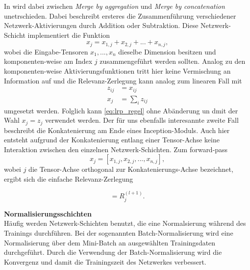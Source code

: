 \documentclass[11pt,a4paper]{article}
\numberwithin{equation}{section}
\begin{document}
	In \cite{sebastianlapuschkin} wird dabei zwischen \textit{Merge by aggregation} und \textit{Merge by concatenation} unetrschieden. Dabei beschreibt ersteres die Zusammenführung verschiedener Netzwerk-Aktivierungen durch Addition oder Subtraktion. Diese Netzwerk-Schicht implementiert die Funktion
	\begin{equation}
		x_j = x_{1,j} + x_{2,j} + ... + x_{n,j},
	\end{equation}
	wobei die Eingabe-Tensoren $x_1, ..., x_n$ dieselbe Dimension besitzen und komponenten-weise am Index $j$ zusammengeführt werden sollten. Analog zu den komponenten-weise Aktivierungsfunktionen tritt hier keine Vermischung an Information auf und die Relevanz-Zerlegung kann analog zum linearen Fall mit 
	\begin{align}
		z_{ij} &= x_{ij}\\
		x_j &= \sum_i{z_{ij}}
	\end{align} umgesetzt werden. Folglich kann \autoref{eq:lrp_regel} ohne Abänderung un dmit der Wahl $x_j= z_j$ verwendet werden. Der für uns ebenfalls interesannte zweite Fall beschreibt die Konkatenierung am Ende eines Inception-Moduls. Auch hier entsteht aufgrund der Konkatenierung entlang einer Tensor-Achse keine Interaktion zwischen den einzelnen Netzwerk-Schichten. Zum forward-pass
	\begin{equation}
		x_j = [x_{1,j}, x_{2,j}, ... , x_{n,j}],
	\end{equation}
	wobei $j$ die Tensor-Achse orthogonal zur Konkatenierungs-Achse bezeichnet, ergibt sich die einfache Relevanz-Zerlegung
	
	\begin{equation}
		[R_{1,j}^{(l)}, R_{2,j}^{(l)}, ..., R_{n,j}^{(l)}] = R_j^{(l+1)}.
	\end{equation}
	
	\noindent\textbf{Normalisierungsschichten}\\
	Häufig werden Netzwerk-Schichten benutzt, die eine Normalsierung während des Trainings durchführen. Bei der sogenannten Batch-Normalisierung wird eine Normalisierung über dem Mini-Batch an ausgewählten Trainingsdaten durchgeführt. Durch die Verwendung der Batch-Normalisierung wird die Konvergenz und damit die Trainingszeit des Netzwerkes verbessert.
	
\end{document}
